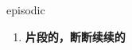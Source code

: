 
\begin{frame}
{\huge episodic}
\begin{center}
\begin{enumerate}\Large
  \item \textbf{片段的，断断续续的}
\end{enumerate}
\end{center}
\end{frame}
